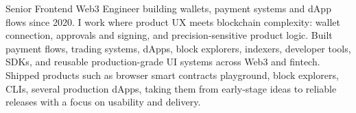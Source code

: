 

\begin{cvparagraph}

Senior Frontend Web3 Engineer building wallets, payment systems and dApp flows since 2020.
\newline
I work where product UX meets blockchain complexity: wallet connection, approvals and signing, and precision-sensitive product logic.
\newline
Built payment flows, trading systems, dApps, block explorers, indexers, developer tools, SDKs, and reusable production-grade UI systems across Web3 and fintech.
\newline
Shipped products such as browser smart contracts playground, block explorers, CLIs, several production dApps, taking them from early-stage ideas to reliable releases with a focus on usability and delivery.
\end{cvparagraph}
